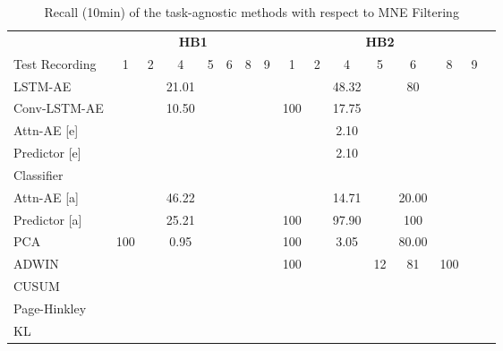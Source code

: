 \begin{table}[btp]
\centering
\caption{Recall (10min) of the task-agnostic methods with respect to MNE Filtering}
\label{tab10}

\begin{tabular}{lccccccccccccccc}
\toprule
          & \multicolumn{7}{c}{\textbf{HB1}} & \multicolumn{7}{c}{\textbf{HB2}} \\
\cmidrule(lr){2-8}\cmidrule(lr){9-15}
Test Recording & 1 & 2 & 4 & 5 & 6 & 8 & 9 & 1 & 2 & 4 & 5 & 6 & 8 & 9 \\
\cmidrule(lr){2-8}\cmidrule(lr){9-15}
LSTM-AE      &       &       & 21.01 &       &       &       &       &       &       & 48.32 &       & 80 &       &       \\
Conv-LSTM-AE &       &       & 10.50 &       &       &       &       & 100   &       & 17.75 &       &       &       &       \\
\midrule
Attn-AE [e]  &       &       &       &       &       &       &       &       &       & 2.10  &       &       &       &       \\
Predictor [e]&       &       &       &       &       &       &       &       &       & 2.10  &       &       &       &       \\
Classifier  &&     &       &       &       &       &       &       &       &       &       &       &       &         \\
\midrule
Attn-AE [a]  &       &       & 46.22 &       &       &       &       &       &       & 14.71 &       & 20.00 &       &       \\
Predictor [a]&       &       & 25.21 &       &       &       &       & 100   &       & 97.90 &       & 100   &       &       \\
\midrule
PCA          & 100   &       & 0.95  &       &       &       &       & 100   &       & 3.05  &       & 80.00 &       &       \\
ADWIN      &   &     &   &    &      &  &       & 100  &   &       & 12  &  81  &  100  &         \\
CUSUM      &   &     &       &    &       &    &       &  &    &       &   &  &   &         \\
Page-Hinkley      &   &     &       &    &       &    &       &   &    &       &  &  &    &         \\
KL      &   &     &       &    &       &    &       &   &   &       &  &  &    &         \\
\bottomrule
\end{tabular}

\end{table}

